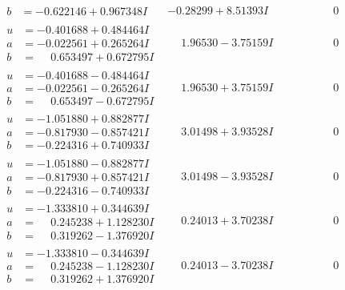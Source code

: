 \documentclass[1p]{elsarticle_modified}
\theoremstyle{definition}
\begin{document}
$$\begin{array}{c|c|c}
\begin{aligned}
b &= -0.622146 + 0.967348 I\end{aligned}
 & -0.28299 + 8.51393 I & \phantom{-0.000000 } 0 \\ \hline\begin{aligned}
u &= -0.401688 + 0.484464 I \\
a &= -0.022561 + 0.265264 I \\
b &= \phantom{-}0.653497 + 0.672795 I\end{aligned}
 & \phantom{-}1.96530 - 3.75159 I & \phantom{-0.000000 } 0 \\ \hline\begin{aligned}
u &= -0.401688 - 0.484464 I \\
a &= -0.022561 - 0.265264 I \\
b &= \phantom{-}0.653497 - 0.672795 I\end{aligned}
 & \phantom{-}1.96530 + 3.75159 I & \phantom{-0.000000 } 0 \\ \hline\begin{aligned}
u &= -1.051880 + 0.882877 I \\
a &= -0.817930 - 0.857421 I \\
b &= -0.224316 + 0.740933 I\end{aligned}
 & \phantom{-}3.01498 + 3.93528 I & \phantom{-0.000000 } 0 \\ \hline\begin{aligned}
u &= -1.051880 - 0.882877 I \\
a &= -0.817930 + 0.857421 I \\
b &= -0.224316 - 0.740933 I\end{aligned}
 & \phantom{-}3.01498 - 3.93528 I & \phantom{-0.000000 } 0 \\ \hline\begin{aligned}
u &= -1.333810 + 0.344639 I \\
a &= \phantom{-}0.245238 + 1.128230 I \\
b &= \phantom{-}0.319262 - 1.376920 I\end{aligned}
 & \phantom{-}0.24013 + 3.70238 I & \phantom{-0.000000 } 0 \\ \hline\begin{aligned}
u &= -1.333810 - 0.344639 I \\
a &= \phantom{-}0.245238 - 1.128230 I \\
b &= \phantom{-}0.319262 + 1.376920 I\end{aligned}
 & \phantom{-}0.24013 - 3.70238 I & \phantom{-0.000000 } 0 \\ \hline\begin{aligned}

\end{aligned}
\end{array}$$
\end{document}
